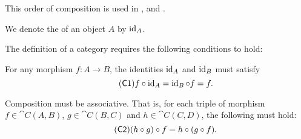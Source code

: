 \begin{definition}
\begin{thmenum}[series=def:category]
    This order of composition is used in \cite[7]{MacLane1994}, \cite[def. 1.1.1]{Leinster2016Basic} and \cite[def 3.1.]{Aluffi2009}.

     We denote the  of an object \( A \) by \( \operatorname{id}_A \).
  \end{thmenum}

  The definition of a category requires the following conditions to hold:
  \begin{thmenum}[resume=def:category]
     For any morphism \( f: A \to B \), the identities \( \operatorname{id}_A \) and \( \operatorname{id}_B \) must satisfy
    \begin{equation}\label{eq:def:category/C1}\tag{\logic{C1}}
      f \bincirc \id_A = \id_B \bincirc f = f.
    \end{equation}

     Composition must be associative. That is, for each triple of morphism \( f \in \cat{C}(A, B) \), \( g \in \cat{C}(B, C) \) and \( h \in \cat{C}(C, D) \), the following must hold:
    \begin{equation}\label{eq:def:category/C2}\tag{\logic{C2}}
      (h \bincirc g) \bincirc f = h \bincirc (g \bincirc f).
    \end{equation}
  \end{thmenum}
\end{definition}

